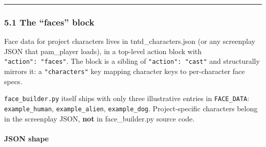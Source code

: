 \documentclass[
  11pt,
]{book}
\begin{document}
\begin{center}\rule{0.5\linewidth}{0.5pt}\end{center}

\subsubsection{5.1 The ``faces'' block}\label{the-faces-block}

Face data for project characters lives in tntd\_characters.json (or any
screenplay JSON that pam\_player loads), in a top-level action block
with \texttt{"action":\ "faces"}. The block is a sibling of
\texttt{"action":\ "cast"} and structurally mirrors it: a
\texttt{"characters"} key mapping character keys to per-character face
specs.

\texttt{face\_builder.py} itself ships with only three illustrative
entries in \texttt{FACE\_DATA}: \texttt{example\_human},
\texttt{example\_alien}, \texttt{example\_dog}. Project-specific
characters belong in the screenplay JSON, \textbf{not} in
face\_builder.py source code.

\paragraph{JSON shape}\label{json-shape}
\end{document}
